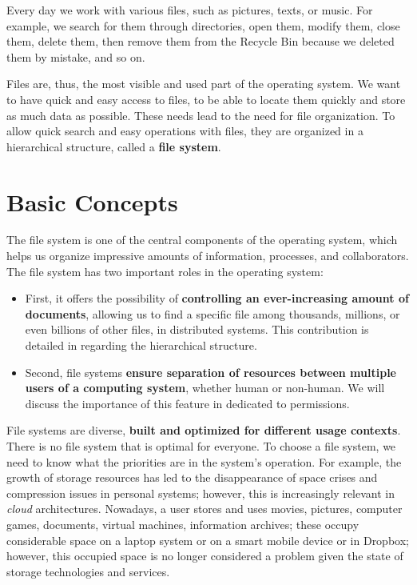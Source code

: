 \label{ch:fs}

Every day we work with various files, such as pictures, texts, or music.
For example, we search for them through directories, open them, modify them, close them, delete them, then remove them from the Recycle Bin because we deleted them by mistake, and so on.

Files are, thus, the most visible and used part of the operating system.
We want to have quick and easy access to files, to be able to locate them quickly and store as much data as possible.
These needs lead to the need for file organization.
To allow quick search and easy operations with files, they are organized in a hierarchical structure, called a \textbf{file system}.

\section{Basic Concepts}
\label{sec:data-files:concepts}

The file system is one of the central components of the operating system, which helps us organize impressive amounts of information, processes, and collaborators.
The file system has two important roles in the operating system:

\begin{itemize}
  \item First, it offers the possibility of \textbf{controlling an ever-increasing amount of documents}, allowing us to find a specific file among thousands, millions, or even billions of other files, in distributed systems.
    This contribution is detailed in  regarding the hierarchical structure.
  \item Second, file systems \textbf{ensure separation of resources between multiple users of a computing system}, whether human or non-human.
    We will discuss the importance of this feature in  dedicated to permissions.
\end{itemize}

File systems are diverse, \textbf{built and optimized for different usage contexts}.
There is no file system that is optimal for everyone.
To choose a file system, we need to know what the priorities are in the system's operation.
For example, the growth of storage resources has led to the disappearance of space crises and compression issues in personal systems;
however, this is increasingly relevant in \textit{cloud} architectures.
Nowadays, a user stores and uses movies, pictures, computer games, documents, virtual machines, information archives;
these occupy considerable space on a laptop system or on a smart mobile device or in Dropbox;
however, this occupied space is no longer considered a problem given the state of storage technologies and services.

